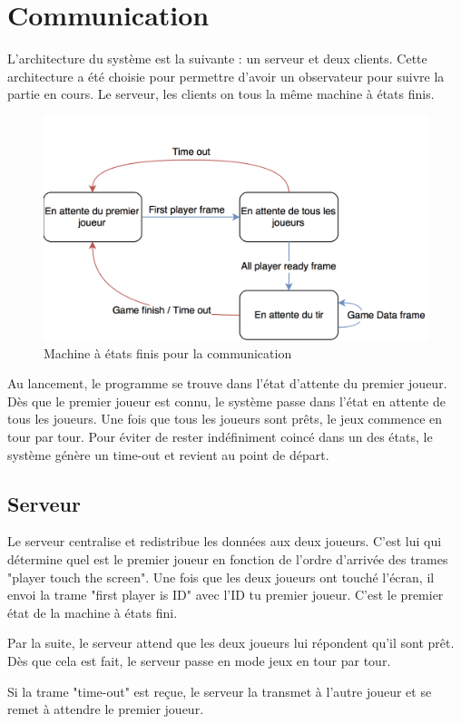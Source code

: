 \chapter{Communication}
L'architecture du système est la suivante : un serveur et deux clients. Cette architecture a été choisie pour permettre d'avoir un observateur pour suivre la partie en cours. 
Le serveur, les clients on tous la même machine à états finis.
\begin{figure}[!ht]
\centering
\includegraphics[scale=0.3]{img/fsm.png}
\caption{Machine à états finis pour la communication}
\label{fig9}
\end{figure}
Au lancement, le programme se trouve dans l'état d'attente du premier joueur. Dès que le premier joueur est connu, le système passe dans l'état en attente de tous les joueurs. Une fois que tous les joueurs sont prêts, le jeux commence en tour par tour. Pour éviter de rester indéfiniment coincé dans un des états, le système génère un time-out et revient au point de départ.
\section{Serveur}
Le serveur centralise et redistribue les données aux deux joueurs. C'est lui qui détermine quel est le premier joueur en fonction de l'ordre d'arrivée des trames "player touch the screen". Une fois que les deux joueurs ont touché l'écran, il envoi la trame "first player is ID" avec l'ID tu premier joueur. C'est le premier état de la machine à états fini.

Par la suite, le serveur attend que les deux joueurs lui répondent qu'il sont prêt. Dès que cela est fait, le serveur passe en mode jeux en tour par tour.

Si la trame "time-out" est reçue, le serveur la transmet à l'autre joueur et se remet à attendre le premier joueur.
